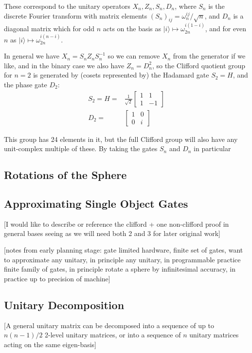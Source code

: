 \documentclass[]{article}
\newcommand{\ket}[1]{| #1 \rangle}
\begin{document}
These correspond to the unitary operators $X_n, Z_n, S_n, D_n$, where $S_n$ is the discrete Fourier transform with matrix elements $(S_n)_{ij} = \omega_n^{ij}/\sqrt{n}$, and $D_n$ is a diagonal matrix which for odd $n$ acts on the basis as $\ket{i} \mapsto \omega_{2n}^{i(1-i)}$, and for even $n$ as $\ket{i} \mapsto \omega_{2n}^{i(n-i)}$.

In general we have $X_n = S_nZ_nS_n^{-1}$ so we can remove $X_n$ from the generator if we like, and in the binary case we also have $Z_n = D_n^2$, so the Clifford quotient group for $n=2$ is generated by (cosets represented by) the Hadamard gate $S_2=H$, and the phase gate $D_2$:
\begin{align*}
S_2 = H =& \frac{1}{\sqrt{2}}\left[\begin{matrix}
1&1\\
1&-1
\end{matrix}\right]
\\
D_2 =& \left[\begin{matrix}
1&0\\
0&i
\end{matrix}\right]
\end{align*}

This group has 24 elements in it, but the full Clifford group will also have any unit-complex multiple of these. By taking the gates $S_n$ and $D_n$ in particular 

\subsection{Rotations of the Sphere}

\subsection{Approximating Single Object Gates}
[I would like to describe or reference the clifford + one non-clifford proof in general bases seeing as we will need both 2 and 3 for later original work]

[notes from early planning stage: gate limited hardware, finite set of gates, want to approximate any unitary, in principle any unitary, in programmable practice finite family of gates, in principle rotate a sphere by infinitesimal accuracy, in practice up to precision of machine]

\subsection{Unitary Decomposition}
[A general unitary matrix can be decomposed into a sequence of up to $n(n-1)/2$ 2-level unitary matrices, or into a sequence of $n$ unitary matrices acting on the same eigen-basis]
\end{document}
